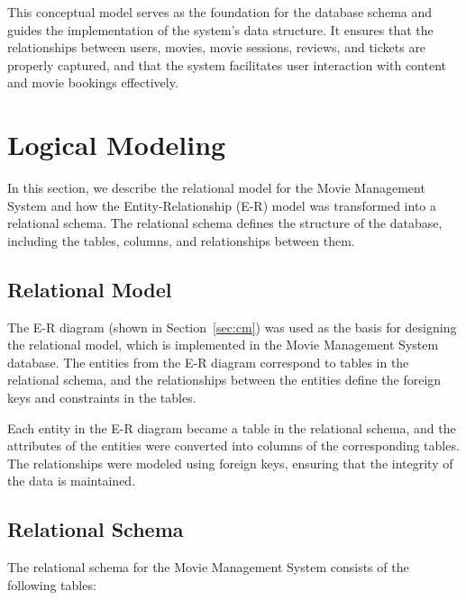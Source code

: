 \documentclass[a4paper,12pt]{article}  %
\begin{document}
This conceptual model serves as the foundation for the database schema and guides the implementation of the system's data structure. It ensures that the relationships between users, movies, movie sessions, reviews, and tickets are properly captured, and that the system facilitates user interaction with content and movie bookings effectively.


\clearpage


\section{Logical Modeling} \label{sec:lm}

In this section, we describe the relational model for the Movie Management System and how the Entity-Relationship (E-R) model was transformed into a relational schema. The relational schema defines the structure of the database, including the tables, columns, and relationships between them.

\subsection{Relational Model}

The E-R diagram (shown in Section~\ref{sec:cm}) was used as the basis for designing the relational model, which is implemented in the Movie Management System database. The entities from the E-R diagram correspond to tables in the relational schema, and the relationships between the entities define the foreign keys and constraints in the tables.

Each entity in the E-R diagram became a table in the relational schema, and the attributes of the entities were converted into columns of the corresponding tables. The relationships were modeled using foreign keys, ensuring that the integrity of the data is maintained.

\subsection{Relational Schema}

The relational schema for the Movie Management System consists of the following tables:
\end{document}
